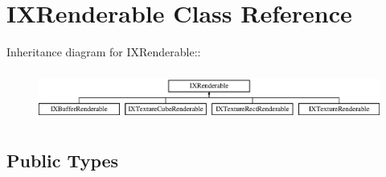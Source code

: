 \hypertarget{class_i_x_renderable}{
\section{IXRenderable Class Reference}
\label{class_i_x_renderable}
}
Inheritance diagram for IXRenderable::\begin{figure}[H]
\begin{center}
\leavevmode
\includegraphics[height=1.6568cm]{class_i_x_renderable}
\end{center}
\end{figure}
\subsection*{Public Types}
